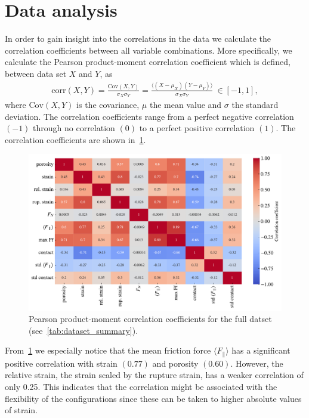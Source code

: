 \section{Data analysis}
In order to gain insight into the correlations in the data we calculate the correlation coefficients between all variable combinations. More specifically, we calculate the Pearson product-moment correlation coefficient which is defined, between data set $X$ and $Y$, as
\begin{align*}
  \mathrm{corr}(X,Y) = \frac{\mathrm{Cov}(X,Y)}{\sigma_X \sigma_Y} = \frac{\langle (X - \mu_X)(Y - \mu_Y)\rangle}{\sigma_X \sigma_Y} \ \in [-1, 1],
\end{align*}
where $\mathrm{Cov}(X,Y)$ is the covariance, $\mu$ the mean value and $\sigma$ the standard deviation. The correlation coefficients range from a perfect negative correlation $(-1)$ through no correlation $(0)$ to a perfect positive correlation $(1)$. The correlation coefficients are shown in~\cref{fig:corrcoef_matrix}.
\begin{figure}[H]
  \centering
  \includegraphics[width=\linewidth]{figures/ML/corrcoef_matrix.pdf}
  \caption{Pearson product-moment correlation coefficients for the full datset (see~\cref{tab:dataset_summary}).}
  \label{fig:corrcoef_matrix}
\end{figure}
From~\cref{fig:corrcoef_matrix} we especially notice that the mean friction
force $\langle F_{\parallel} \rangle$ has a significant positive correlation
with strain $(0.77)$ and porosity $(0.60)$. However, the relative strain, the
strain scaled by the rupture strain, has a weaker correlation of only 0.25.
This indicates that the correlation might be associated with the flexibility of
the configurations since these can be taken to higher absolute values of strain.
